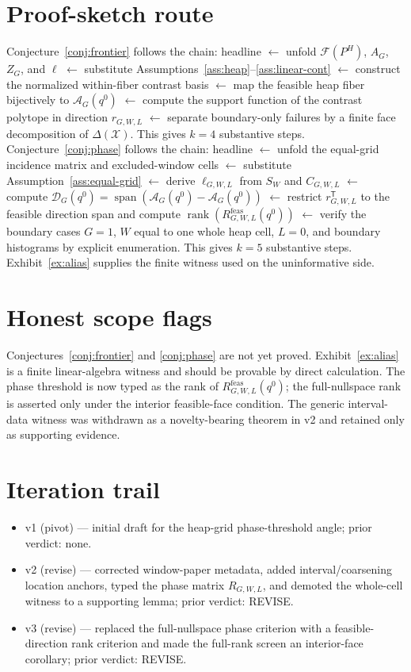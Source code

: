 \documentclass[11pt]{article}
\newcommand{\transpose}{\mathsf{T}}
\theoremstyle{definition}
\theoremstyle{plain}
\theoremstyle{remark}
\begin{document}
\section{Proof-sketch route}
Conjecture~\ref{conj:frontier} follows the chain: headline \(\leftarrow\) unfold \(\mathcal{F}(P^H)\), \(A_G\), \(Z_G\), and \(\ell\) \(\leftarrow\) substitute Assumptions~\ref{ass:heap}--\ref{ass:linear-cont} \(\leftarrow\) construct the normalized within-fiber contrast basis \(\leftarrow\) map the feasible heap fiber bijectively to \(\mathcal{A}_G(q^0)\) \(\leftarrow\) compute the support function of the contrast polytope in direction \(r_{G,W,L}\) \(\leftarrow\) separate boundary-only failures by a finite face decomposition of \(\Delta(\mathcal{X})\).  This gives \(k=4\) substantive steps.  Conjecture~\ref{conj:phase} follows the chain: headline \(\leftarrow\) unfold the equal-grid incidence matrix and excluded-window cells \(\leftarrow\) substitute Assumption~\ref{ass:equal-grid} \(\leftarrow\) derive \(\ell_{G,W,L}\) from \(S_W\) and \(C_{G,W,L}\) \(\leftarrow\) compute \(\mathcal{D}_G(q^0)=\operatorname{span}(\mathcal{A}_G(q^0)-\mathcal{A}_G(q^0))\) \(\leftarrow\) restrict \(r_{G,W,L}^{\transpose}\) to the feasible direction span and compute \(\operatorname{rank}(R^{\mathrm{feas}}_{G,W,L}(q^0))\) \(\leftarrow\) verify the boundary cases \(G=1\), \(W\) equal to one whole heap cell, \(L=0\), and boundary histograms by explicit enumeration.  This gives \(k=5\) substantive steps.  Exhibit~\ref{ex:alias} supplies the finite witness used on the uninformative side.

\section{Honest scope flags}
Conjectures~\ref{conj:frontier} and \ref{conj:phase} are not yet proved.  Exhibit~\ref{ex:alias} is a finite linear-algebra witness and should be provable by direct calculation.  The phase threshold is now typed as the rank of \(R^{\mathrm{feas}}_{G,W,L}(q^0)\); the full-nullspace rank is asserted only under the interior feasible-face condition.  The generic interval-data witness was withdrawn as a novelty-bearing theorem in v2 and retained only as supporting evidence.

\section{Iteration trail}
\begin{itemize}[leftmargin=*]
\item v1 (pivot) --- initial draft for the heap-grid phase-threshold angle; prior verdict: none.
\item v2 (revise) --- corrected window-paper metadata, added interval/coarsening location anchors, typed the phase matrix \(R_{G,W,L}\), and demoted the whole-cell witness to a supporting lemma; prior verdict: REVISE.
\item v3 (revise) --- replaced the full-nullspace phase criterion with a feasible-direction rank criterion and made the full-rank screen an interior-face corollary; prior verdict: REVISE.
\end{itemize}
\end{document}

